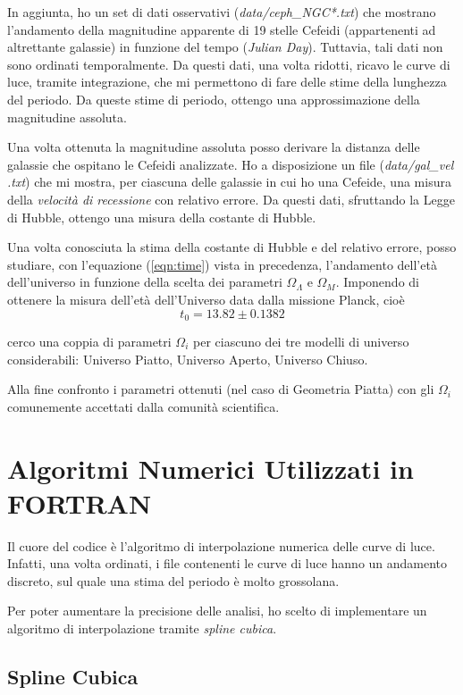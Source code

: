 \documentclass{article}
\begin{document}
In aggiunta, ho un set di dati osservativi (\emph{data/ceph\_NGC*.txt}) che mostrano l'andamento
della magnitudine apparente di 19 stelle Cefeidi (appartenenti ad
altrettante galassie) in funzione del tempo (\emph{Julian Day}). Tuttavia, tali dati non
sono ordinati temporalmente. Da questi dati, una volta ridotti, ricavo
le curve di luce, tramite integrazione, che mi permettono di fare
delle stime della lunghezza del periodo. Da queste stime di periodo,
ottengo una approssimazione della magnitudine assoluta.

Una volta ottenuta la magnitudine assoluta posso derivare la distanza
delle galassie che ospitano le Cefeidi analizzate. Ho a disposizione
un file (\emph{data/gal\_vel .txt}) che mi mostra, per ciascuna delle galassie in cui ho una
Cefeide, una misura della \emph{velocità di recessione} con relativo
errore. Da questi dati, sfruttando la Legge di Hubble, ottengo una
misura della costante di Hubble.

Una volta conosciuta la stima della costante di Hubble e del relativo
errore, posso studiare, con l'equazione (\ref{eqn:time}) vista in
precedenza, l'andamento dell'età dell'universo in funzione della
scelta dei parametri $\Omega_\Lambda$ e $\Omega_M$. Imponendo di
ottenere la misura dell'età dell'Universo data dalla missione Planck,
cioè
\begin{equation*}
  t_0 = 13.82 \pm 0.1382
\end{equation*}

cerco una coppia di parametri $\Omega_i$ per ciascuno dei tre modelli
di universo considerabili: Universo Piatto, Universo Aperto, Universo
Chiuso.

Alla fine confronto i parametri ottenuti (nel caso di Geometria
Piatta) con gli $\Omega_i$ comunemente accettati dalla comunità scientifica.

\clearpage
\section{Algoritmi Numerici Utilizzati in FORTRAN}

Il cuore del codice è l'algoritmo di interpolazione numerica delle
curve di luce. Infatti, una volta ordinati, i file contenenti le curve
di luce hanno un andamento discreto, sul quale una stima del periodo è
molto grossolana.

Per poter aumentare la precisione delle analisi, ho scelto di implementare un
algoritmo di interpolazione tramite \emph{spline cubica}.

\subsection{Spline Cubica}
\end{document}

